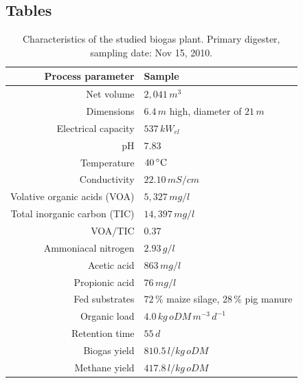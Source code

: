 \documentclass{bmcart}
\begin{document}
\begin{backmatter}


\newpage
\section*{Tables}
\begin{table}[h!]
\caption{Characteristics of the studied biogas plant. Primary digester, sampling date: Nov 15, 2010.}
\begin{tabular}{rl}
\hline
Process parameter & Sample\\
\hline
Net volume & $2,041\,m^{3}$\\
Dimensions & $6.4\,m$ high, diameter of $21\,m$\\
Electrical capacity & $537\,kW_{el}$\\
\hline
pH & $7.83$\\
Temperature & $40\,^{\circ}{\rm C}$\\
Conductivity & $22.10\,mS/cm$\\
Volative organic acids (VOA) & $5,327\,mg/l$\\
Total inorganic carbon (TIC) & $14,397\,mg/l$\\
VOA/TIC & $0.37$\\
Ammoniacal nitrogen & $2.93\,g/l$\\
Acetic acid & $863\,mg/l$\\
Propionic acid & $76\,mg/l$\\
\hline
Fed substrates & $72\,\%$ maize silage, $28\,\%$ pig manure\\
Organic load & $4.0\,kg\,oDM\,m^{-3}\,d^{-1}$\\
Retention time & $55\,d$\\
Biogas yield & $810.5\,l/kg\,oDM$\\
Methane yield & $417.8\,l/kg\,oDM$\\
\hline
\end{tabular}
\label{tBiogasPlant}
\end{table}


\end{backmatter}
\end{document}
